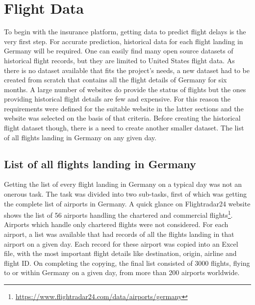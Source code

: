 \chapter{Flight Data}
To begin with the insurance platform, getting data to predict flight delays is the very first step. For accurate prediction, historical data for each flight landing in Germany will be required. One can easily find many open source datasets of historical flight records, but they are limited to United States flight data. As there is no dataset available that fits the project's needs, a new dataset had to be created from scratch that contains all the flight details of Germany for six months. A large number of websites do provide the status of flights but the ones providing historical flight details are few and expensive. For this reason the requirements were defined for the suitable website in the latter sections and the website was selected on the basis of that criteria. Before creating the historical flight dataset though, there is a need to create another smaller dataset. The list of all flights landing in Germany on any given day.

\section{List of all flights landing in Germany}
Getting the list of every flight landing in Germany on a typical day was not an onerous task. The task was divided into two sub-tasks, first of which was getting the complete list of airports in Germany. A quick glance on Flightradar24 website shows the list of 56 airports handling the chartered and commercial flights\footnote{\url{https://www.flightradar24.com/data/airports/germany}}. Airports which handle only chartered flights were not considered. For each airport, a list was available that had records of all the flights landing in that airport on a given day. Each record for these airport was copied into an Excel file, with the most important flight details like destination, origin, airline and flight ID. On completing the copying, the final list consisted of 3000 flights, flying to or within Germany on a given day, from more than 200 airports worldwide.

